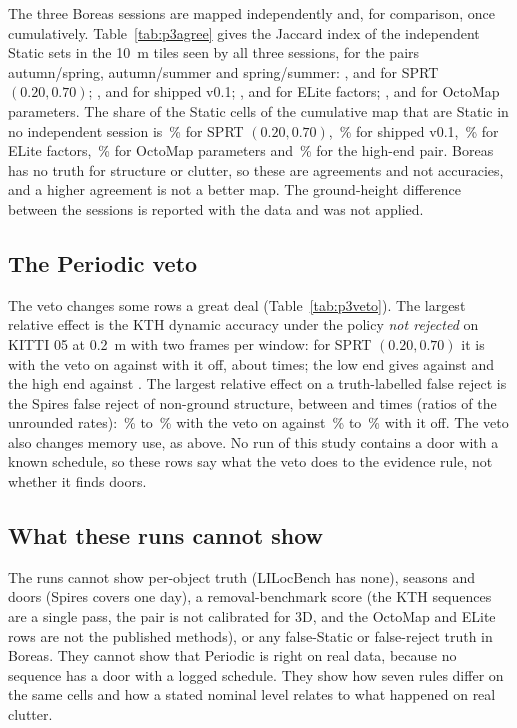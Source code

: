 The three Boreas sessions are mapped independently and, for comparison, once cumulatively. Table~\ref{tab:p3agree} gives the Jaccard index of the independent Static sets in the \PtBorTiles{} 10~m tiles seen by all three sessions, for the pairs autumn/spring, autumn/summer and spring/summer: \PtBorAutSprSprt, \PtBorAutSumSprt{} and \PtBorSprSumSprt{} for SPRT $(0.20,0.70)$; \PtBorAutSprShipped, \PtBorAutSumShipped{} and \PtBorSprSumShipped{} for shipped v0.1; \PtBorAutSprElite, \PtBorAutSumElite{} and \PtBorSprSumElite{} for ELite factors; \PtBorAutSprOcto, \PtBorAutSumOcto{} and \PtBorSprSumOcto{} for OctoMap parameters. The share of the Static cells of the cumulative map that are Static in no independent session is \PtBorOnlySprt\,\% for SPRT $(0.20,0.70)$, \PtBorOnlyShipped\,\% for shipped v0.1, \PtBorOnlyElite\,\% for ELite factors, \PtBorOnlyOcto\,\% for OctoMap parameters and \PtBorOnlyHigh\,\% for the high-end pair. Boreas has no truth for structure or clutter, so these are agreements and not accuracies, and a higher agreement is not a better map. The ground-height difference between the sessions is reported with the data and was not applied.

\subsection{The Periodic veto}\label{subsec:p3veto}



The veto changes some rows a great deal (Table~\ref{tab:p3veto}). The largest relative effect is the KTH dynamic accuracy under the policy \emph{not rejected} on KITTI 05 at 0.2~m with two frames per window: for SPRT $(0.20,0.70)$ it is \PtVetoOnSprt{} with the veto on against \PtVetoOffSprt{} with it off, about \PtVetoTimesSprt{} times; the low end gives \PtVetoOnLow{} against \PtVetoOffLow{} and the high end \PtVetoOnHigh{} against \PtVetoOffHigh. The largest relative effect on a truth-labelled false reject is the Spires false reject of non-ground structure, between \PtVetoSpLo{} and \PtVetoSpHi{} times (ratios of the unrounded rates): \PtSpSprtRejLo\,\% to \PtSpSprtRejHi\,\% with the veto on against \PtSpSprtOffLo\,\% to \PtSpSprtOffHi\,\% with it off. The veto also changes memory use, as above. No run of this study contains a door with a known schedule, so these rows say what the veto does to the evidence rule, not whether it finds doors.

\subsection{What these runs cannot show}\label{subsec:p3cannot}

The runs cannot show per-object truth (LILocBench has none), seasons and doors (Spires covers one day), a removal-benchmark score (the KTH sequences are a single pass, the pair is not calibrated for 3D, and the OctoMap and ELite rows are not the published methods), or any false-Static or false-reject truth in Boreas. They cannot show that Periodic is right on real data, because no sequence has a door with a logged schedule. They show how seven rules differ on the same cells and how a stated nominal level relates to what happened on real clutter.
